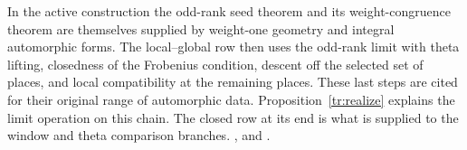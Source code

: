 In the active construction the odd-rank seed theorem and its weight-congruence theorem are themselves supplied by weight-one geometry and integral automorphic forms. The local--global row then uses the odd-rank limit with theta lifting, closedness of the Frobenius condition, descent off the selected set of places, and local compatibility at the remaining places. These last steps are cited for their original range of automorphic data. Proposition~\ref{tr:realize} explains the limit operation on this chain. The closed row at its end is what is supplied to the window and theta comparison branches. ,  and .

